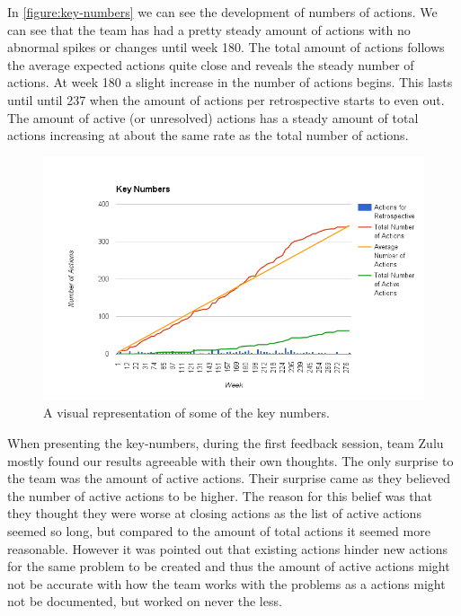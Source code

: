 In \autoref{figure:key-numbers} we can see the development of numbers of actions. We can see that the team has had a pretty steady amount of actions with no abnormal spikes or changes until week 180. The total amount of actions follows the average expected actions quite close and reveals the steady number of actions.
At week 180 a slight increase in the number of actions begins. This lasts until until 237 when the amount of actions per retrospective starts to even out. 
The amount of active (or unresolved) actions has a steady amount of total actions increasing at about the same rate as the total number of actions. 

\begin{figure}[!h]
	\centering
	\includegraphics[width=\textwidth, keepaspectratio]{figures/key-numbers.png}
	\caption{A visual representation of some of the key numbers.}
	\label{figure:key-numbers}
\end{figure}

When presenting the key-numbers, during the first feedback session, team Zulu mostly found our results agreeable with their own thoughts. The only surprise to the team was the amount of active actions. Their surprise came as they believed the number of active actions to be higher. The reason for this belief was that they thought they were worse at closing actions as the list of active actions seemed so long, but compared to the amount of total actions it seemed more reasonable. However it was pointed out that existing actions hinder new actions for the same problem to be created and thus the amount of active actions might not be accurate with how the team works with the problems as a actions might not be documented, but worked on never the less. 


